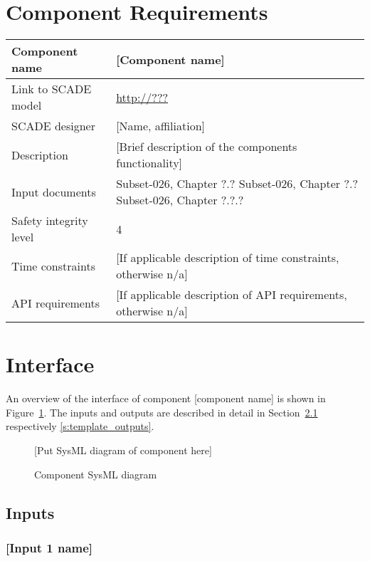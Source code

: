 
\section{Component Requirements}

\begin{longtable}{p{}p{}}
\toprule
Component name			& [Component name] \\
\midrule
Link to SCADE model		& {\footnotesize \url{http://???}} \\
\midrule
SCADE designer			& [Name, affiliation] \\
\midrule
Description				& [Brief description of the components functionality] \\
\midrule
Input documents	& 
Subset-026, Chapter ?.?\newline
Subset-026, Chapter ?.?\newline
Subset-026, Chapter ?.?.?\\
\midrule
Safety integrity level		& 4 \\
\midrule
Time constraints		& [If applicable description of time constraints, otherwise n/a] \\
\midrule
API requirements 		& [If applicable description of API requirements, otherwise n/a] \\
\bottomrule
\end{longtable}


\section{Interface}

An overview of the interface of component [component name] is shown in Figure~\ref{f:template_interface}. The inputs and outputs are described in detail in Section~\ref{s:template_inputs} respectively \ref{s:template_outputs}.

\begin{figure}
\center
{[Put SysML diagram of component here]}
\caption{Component SysML diagram}\label{f:template_interface}
\end{figure}


\subsection{Inputs}\label{s:template_inputs}

\subsubsection{[Input 1 name]}

